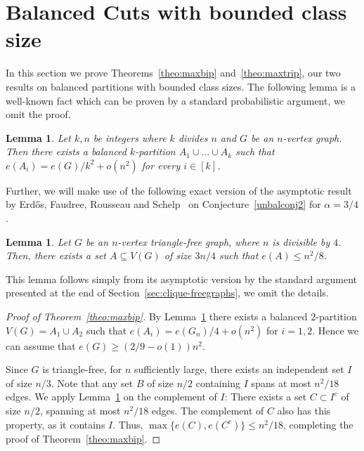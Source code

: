 \documentclass[11pt]{article}
\newtheorem{lemma}[theo]{Lemma}
\theoremstyle{definition}
\numberwithin{theo}{section}
\begin{document}


\section{Balanced Cuts with bounded class size}
\label{sec:maxkpart}
In this section we prove Theorems~\ref{theo:maxbip} and~\ref{theo:maxtrip}, our two results on balanced partitions with bounded class sizes. The following lemma is a well-known fact which can be proven by a standard probabilistic argument, we omit the proof.
\begin{lemma}
Let $k,n$ be integers where $k$ divides $n$ and $G$ be an $n$-vertex graph. Then there exists a balanced $k$-partition $A_1\cup\ldots\cup A_k$ such that $e(A_i)=e(G)/k^2+o(n^2)$ for every $i\in[k]$.
\label{lemma:maxrandomcut}
\end{lemma}
Further, we will make use of the following exact version of the asymptotic result by Erd\H{o}s, Faudree, Rousseau and Schelp~\cite{MR1273598} on Conjecture~\ref{unbalconj2} for $\alpha=3/4$.

\begin{lemma}
\label{ErFaRoSc}
Let $G$ be an $n$-vertex triangle-free graph, where $n$ is divisible by $4$. Then, there exists a set $A\subseteq V(G)$ of size $3n/4$ such that $e(A)\leq n^2/8$.
\end{lemma}
This lemma follows simply from its asymptotic version by the standard argument presented at the end of Section~\ref{sec:clique-freegraphs}, we omit the details. 
\begin{proof}[Proof of Theorem~\ref{theo:maxbip}]
By Lemma~\ref{lemma:maxrandomcut} there exists a balanced $2$-partition $V(G)=A_1\cup A_2$ such that  $e(A_i)=e(G_n)/4+o(n^2)$ for $i=1,2$. Hence we can assume that $e(G)\ge (2/9-o(1))n^2$.

Since $G$ is triangle-free, for $n$ sufficiently large, there exists an independent set $I$ of size $ n/3$. Note that any set $B$ of size $n/2$ containing $I$ spans at most $n^2/18$ edges. We apply Lemma~\ref{ErFaRoSc} on the complement of $I$: There exists a set $C\subset I^c$ of size $n/2$, spanning at most $n^2/18$ edges.
The complement of $C$ also has this property, as it contains $I$. Thus, $\max\{e(C),e(C^c)\}\leq n^2/18$, completing the proof of Theorem~\ref{theo:maxbip}.
\end{proof}
\end{document}
